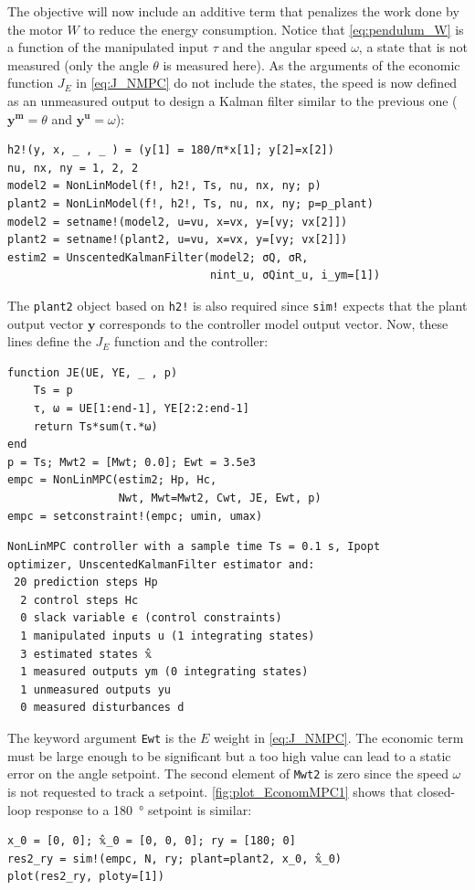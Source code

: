 The objective will now include an additive term that penalizes the work done by the motor $W$ to reduce the energy consumption. Notice that \eqref{eq:pendulum_W} is a function of the manipulated input $\tau$ and the angular speed $\omega$, a state that is not measured (only the angle $\theta$ is measured here). As the arguments of the economic function $J_E$ in \eqref{eq:J_NMPC} do not include the states, the speed is now defined as an unmeasured output to design a Kalman filter similar to the previous one ($\mathbf{y^m} = \theta$ and $\mathbf{y^u} = \omega$): 

\begin{verbatim}
h2!(y, x, _ , _ ) = (y[1] = 180/π*x[1]; y[2]=x[2])
nu, nx, ny = 1, 2, 2
model2 = NonLinModel(f!, h2!, Ts, nu, nx, ny; p)
plant2 = NonLinModel(f!, h2!, Ts, nu, nx, ny; p=p_plant)
model2 = setname!(model2, u=vu, x=vx, y=[vy; vx[2]])
plant2 = setname!(plant2, u=vu, x=vx, y=[vy; vx[2]])
estim2 = UnscentedKalmanFilter(model2; σQ, σR, 
                               nint_u, σQint_u, i_ym=[1])
\end{verbatim}
The \texttt{plant2} object based on \texttt{h2!} is also required since \texttt{sim!} expects that the plant output vector $\mathbf{y}$ corresponds to the controller model output vector. Now, these lines define the $J_E$ function and the controller:
\begin{verbatim}
function JE(UE, YE, _ , p)
    Ts = p
    τ, ω = UE[1:end-1], YE[2:2:end-1]
    return Ts*sum(τ.*ω)
end
p = Ts; Mwt2 = [Mwt; 0.0]; Ewt = 3.5e3
empc = NonLinMPC(estim2; Hp, Hc, 
                 Nwt, Mwt=Mwt2, Cwt, JE, Ewt, p)
empc = setconstraint!(empc; umin, umax)
\end{verbatim}
\spacerepl
\begin{verbatim}
NonLinMPC controller with a sample time Ts = 0.1 s, Ipopt
optimizer, UnscentedKalmanFilter estimator and:
 20 prediction steps Hp
  2 control steps Hc
  0 slack variable ϵ (control constraints)
  1 manipulated inputs u (1 integrating states)
  3 estimated states 𝕩̂
  1 measured outputs ym (0 integrating states)
  1 unmeasured outputs yu
  0 measured disturbances d
\end{verbatim}

The keyword argument \texttt{Ewt} is the $E$ weight in \eqref{eq:J_NMPC}. The economic term must be large enough to be significant but a too high value can lead to a static error on the angle setpoint. The second element of \texttt{Mwt2} is zero since the speed $\omega$ is not requested to track a setpoint. \cref{fig:plot_EconomMPC1} shows that closed-loop response to a \SI{180}{\degree} setpoint is similar:
\begin{verbatim}
x_0 = [0, 0]; 𝕩̂_0 = [0, 0, 0]; ry = [180; 0]
res2_ry = sim!(empc, N, ry; plant=plant2, x_0, 𝕩̂_0)
plot(res2_ry, ploty=[1])
\end{verbatim}

